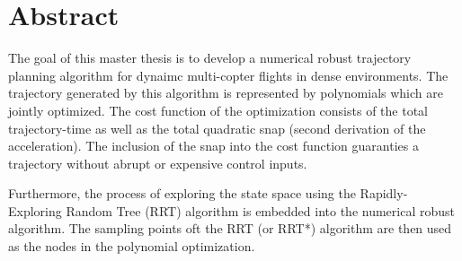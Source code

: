 




 \setcounter{tocdepth}{2}
 \tableofcontents

 \cleardoublepage







\chapter*{Abstract}

The goal of this master thesis is to develop a numerical robust trajectory planning algorithm for dynaimc multi-copter flights in dense environments. The trajectory generated by this algorithm is represented by polynomials which are jointly optimized. The cost function of the optimization consists of the total trajectory-time as well as the total quadratic snap (second derivation of the acceleration). The inclusion of the snap into the cost function guaranties a trajectory without abrupt or expensive control inputs. \newline

Furthermore, the process of exploring the state space using the Rapidly-Exploring Random Tree (RRT) algorithm is embedded into the numerical robust algorithm. The sampling points oft the RRT (or RRT*) algorithm are then used as the nodes in the polynomial optimization.


\newpage


